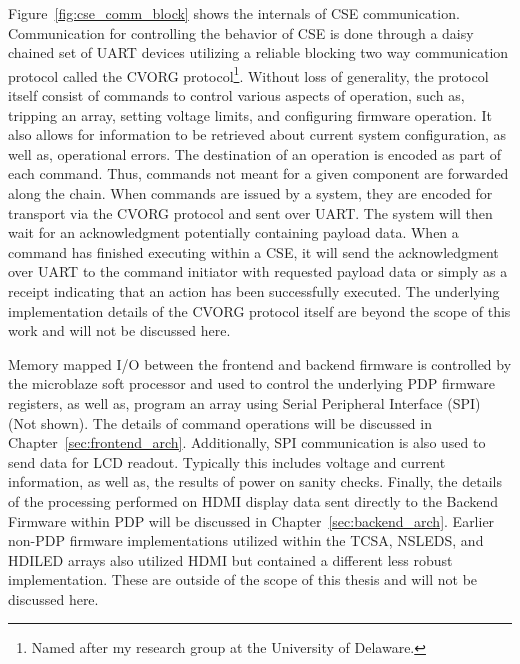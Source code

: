     Figure~\ref{fig:cse_comm_block} shows the internals of CSE communication. Communication for controlling the behavior of CSE is done through a daisy chained set of UART devices utilizing a reliable blocking two way communication protocol called the CVORG protocol\footnote{Named after my research group at the University of Delaware.}. Without loss of generality, the protocol itself consist of commands to control various aspects of operation, such as, tripping an array, setting voltage limits, and configuring firmware operation. It also allows for information to be retrieved about current system configuration, as well as, operational errors. The destination of an operation is encoded as part of each command. Thus, commands not meant for a given component are forwarded along the chain. When commands are issued by a system, they are encoded for transport via the CVORG protocol and sent over UART. The system will then wait for an acknowledgment potentially containing payload data. When a command has finished executing within a CSE, it will send the acknowledgment over UART to the command initiator with requested payload data or simply as a receipt indicating that an action has been successfully executed. The underlying implementation details of the CVORG protocol itself are beyond the scope of this work and will not be discussed here.

    Memory mapped I/O between the frontend and backend firmware is controlled by the microblaze soft processor and used to control the underlying PDP firmware registers, as well as, program an array using Serial Peripheral Interface (SPI) (Not shown). The details of command operations will be discussed in Chapter~\ref{sec:frontend_arch}. Additionally, SPI communication is also used to send data for LCD readout. Typically this includes voltage and current information, as well as, the results of power on sanity checks. Finally, the details of the processing performed on HDMI display data sent directly to the Backend Firmware within PDP will be discussed in Chapter~\ref{sec:backend_arch}. Earlier non-PDP firmware implementations utilized within the TCSA, NSLEDS, and HDILED arrays also utilized HDMI but contained a different less robust implementation. These are outside of the scope of this thesis and will not be discussed here.


